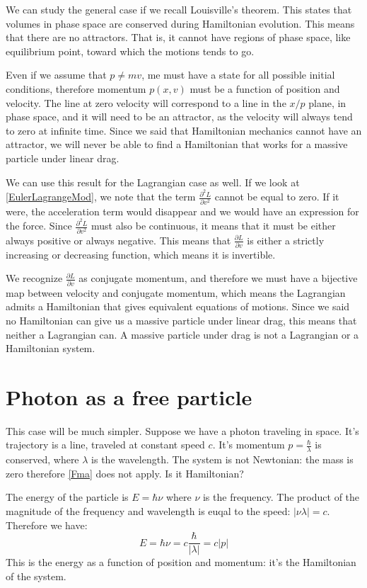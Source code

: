 \documentclass[11pt]{article}
\begin{document}
We can study the general case if we recall Louisville's theorem. This states that volumes in phase space are conserved during Hamiltonian evolution. This means that there are no attractors. That is, it cannot have regions of phase space, like equilibrium point, toward which the motions tends to go.

Even if we assume that $p \neq mv$, me must have a state for all possible initial conditions, therefore momentum $p(x,v)$ must be a function of position and velocity. The line at zero velocity will correspond to a line in the $x/p$ plane, in phase space, and it will need to be an attractor, as the velocity will always tend to zero at infinite time. Since we said that Hamiltonian mechanics cannot have an attractor, we will never be able to find a Hamiltonian that works for a massive particle under linear drag.

We can use this result for the Lagrangian case as well. If we look at \eqref{EulerLagrangeMod}, we note that the term $\frac{\partial^2 L}{\partial v^2}$ cannot be equal to zero. If it were, the acceleration term would disappear and we would have an expression for the force. Since $\frac{\partial^2 L}{\partial v^2}$ must also be continuous, it means that it must be either always positive or always negative. This means that $\frac{\partial L}{\partial v}$ is either a strictly increasing or decreasing function, which means it is invertible.

We recognize $\frac{\partial L}{\partial v}$ as conjugate momentum, and therefore we must have a bijective map between velocity and conjugate momentum, which means the Lagrangian admits a Hamiltonian that gives equivalent equations of motions. Since we said no Hamiltonian can give us a massive particle under linear drag, this means that neither a Lagrangian can. A massive particle under drag is not a Lagrangian or a Hamiltonian system.

\section{Photon as a free particle}

This case will be much simpler. Suppose we have a photon traveling in space. It's trajectory is a line, traveled at constant speed $c$. It's momentum $p=\frac{\hbar}{\lambda}$ is conserved, where $\lambda$ is the wavelength. The system is not Newtonian: the mass is zero therefore \eqref{Fma} does not apply. Is it Hamiltonian?

The energy of the particle is $E=\hbar \nu$ where $\nu$ is the frequency. The product of the magnitude of the frequency and wavelength is euqal to the speed: $|\nu \lambda| = c$. Therefore we have:
\begin{equation*}
	E=\hbar \nu = c \frac{\hbar}{|\lambda|} = c|p| \end{equation*}
This is the energy as a function of position and momentum: it's the Hamiltonian of the system.
\end{document}

